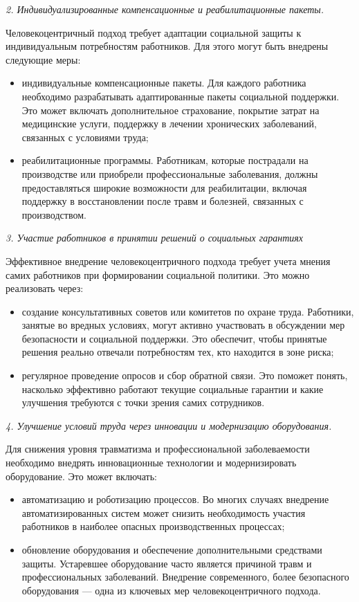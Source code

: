 \emph{2. Индивидуализированные компенсационные и реабилитационные
пакеты.}

Человекоцентричный подход требует адаптации социальной защиты к
индивидуальным потребностям работников. Для этого могут быть внедрены
следующие меры:

\begin{itemize}
\item
  индивидуальные компенсационные пакеты. Для каждого работника
  необходимо разрабатывать адаптированные пакеты социальной поддержки.
  Это может включать дополнительное страхование, покрытие затрат на
  медицинские услуги, поддержку в лечении хронических заболеваний,
  связанных с условиями труда;
\item
  реабилитационные программы. Работникам, которые пострадали на
  производстве или приобрели профессиональные заболевания, должны
  предоставляться широкие возможности для реабилитации, включая
  поддержку в восстановлении после травм и болезней, связанных с
  производством.
\end{itemize}

\emph{3. Участие работников в принятии решений о социальных гарантиях}

Эффективное внедрение человекоцентричного подхода требует учета мнения
самих работников при формировании социальной политики. Это можно
реализовать через:

\begin{itemize}
\item
  создание консультативных советов или комитетов по охране труда.
  Работники, занятые во вредных условиях, могут активно участвовать в
  обсуждении мер безопасности и социальной поддержки. Это обеспечит,
  чтобы принятые решения реально отвечали потребностям тех, кто
  находится в зоне риска;
\item
  регулярное проведение опросов и сбор обратной связи. Это поможет
  понять, насколько эффективно работают текущие социальные гарантии и
  какие улучшения требуются с точки зрения самих сотрудников.
\end{itemize}

\emph{4. Улучшение условий труда через инновации и модернизацию
оборудования.}

Для снижения уровня травматизма и профессиональной заболеваемости
необходимо внедрять инновационные технологии и модернизировать
оборудование. Это может включать:

\begin{itemize}
\item
  автоматизацию и роботизацию процессов. Во многих случаях внедрение
  автоматизированных систем может снизить необходимость участия
  работников в наиболее опасных производственных процессах;
\item
  обновление оборудования и обеспечение дополнительными средствами
  защиты. Устаревшее оборудование часто является причиной травм и
  профессиональных заболеваний. Внедрение современного, более
  безопасного оборудования --- одна из ключевых мер человекоцентричного
  подхода.
\end{itemize}

